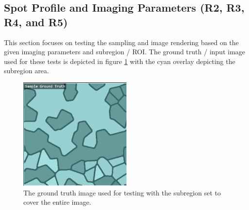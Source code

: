 \documentclass[12pt, titlepage]{article}
\begin{document}
\subsection{Spot Profile and Imaging Parameters (R2, R3, R4, and R5)} \label{ss_params}
This section focuses on testing the sampling and image rendering based on the given
imaging parameters and subregion / ROI. The ground truth / input image used for these tests
is depicted in figure \ref{fig_gt0} with the cyan overlay depicting the subregion area.

\begin{figure}[h!]
  \begin{center}
   \includegraphics[width=0.5\textwidth]{gt0.png}
  \caption{The ground truth image used for testing with the subregion set to cover the entire image.}
  \label{fig_gt0} 
  \end{center}
\end{figure}
\end{document}
